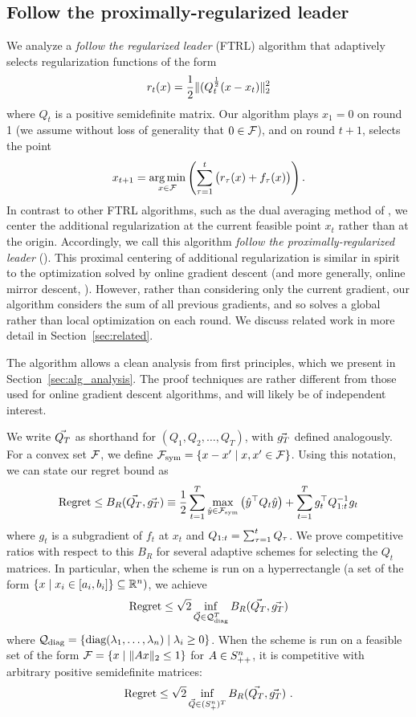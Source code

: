 \subsection{Follow the proximally-regularized leader}
We analyze a \emph {follow the regularized leader}
(FTRL) algorithm
that adaptively selects regularization functions of the
form
\[r_t(x) = \frac 1 2 \|  (Q_t^{\frac 1 2}(x  - x_t) \|^2_2\]
where $Q_t$ is a positive semidefinite matrix.
Our algorithm plays $x_1 = 0$ on round 1 (we assume without loss
of generality that $0 \in \mathcal{F}$), and on round $t+1$, selects the point
\begin{equation}\label{eq:ftrlx}
  x_{t+1} = \mathop{\rm arg\,min}_{x \in \mathcal{F}} \left( 
     \sum_{\tau=1}^t \big(r_\tau(x) + f_\tau(x)\big)  \right).
\end{equation}
In contrast to other FTRL algorithms, such as the dual averaging
method of , we center the additional
regularization at the current feasible point $x_t$ rather than at the
origin.  Accordingly, we call this algorithm \emph{follow the
proximally-regularized leader} (\FTPRL).  This proximal centering of
additional regularization is similar in spirit to the optimization
solved by online gradient descent (and more generally, online mirror
descent, \cite{cesabianchi06plg}).  However, rather than considering
only the current gradient, our algorithm considers the sum of all
previous gradients, and so solves a global rather than local
optimization on each round.  We discuss related work in more detail in
Section~\ref{sec:related}.

The \FTPRL algorithm allows a clean analysis from first principles,
which we present in Section~\ref{sec:alg_analysis}.
The proof
techniques are rather different from those used for online gradient
descent algorithms, and will likely be of independent interest.

We write $\vec{Q_T}$ as shorthand for $(Q_1, Q_2, \dots, Q_T)$, with
$\vec{g_T}$ defined analogously.  For a convex set $\mathcal{F}$, we define
$\mathcal{F}_{\text{sym}} = \left\{ x - x' \mid x, x' \in \mathcal{F}\right\}$. Using this notation, we
can state our regret bound as
\begin{equation}\label{eq:brfunc}
\text{Regret} 
 \leq B_R(\vec{Q_T}, \vec{g_T}) 
 \equiv \frac{1}{2} \sum_{t=1}^T \max_{\hat{y} \in \mathcal{F}_{\text{sym}}} \left( \hat{y}^\top Q_t\hat{y} \right)
          + \sum_{t=1}^T g_t^\top Q_{1:t}^{-1}g_t
\end{equation}
where $g_t$ is a subgradient of $f_t$ at $x_t$ and $Q_{1:t} =
\sum_{\tau=1}^t Q_\tau$.  We prove competitive ratios with respect to
this $B_R$ for several adaptive schemes for selecting the $Q_t$
matrices.  In particular, when the \FTPRLdiag scheme is run on a
hyperrectangle (a set of the form $\left\{x \mid x_i
\in [a_i, b_i]\right\} \subseteq \mathbb{R}^n)$, we achieve
\[ \text{Regret} 
\leq  \sqrt{2} \inf_{\vec{Q} \in \mathcal{Q}_{\text{diag}}^T} B_R(\vec{Q_T}, \vec{g_T})
\]
where $\mathcal{Q}_{\text{diag}} = \left\{ \text{diag}(\lambda_1, \dots, \lambda_n) \mid
\lambda_i \geq 0\right\}$.  When the \FTPRLscale scheme is run on a
feasible set of the form $\mathcal{F} = \left\{x \mid \| Ax \|_2 \leq 1\right\}$ for $A \in S^n_{++}$,
it is competitive with arbitrary positive semidefinite matrices:
\[ \text{Regret} \leq \sqrt{2} 
\inf_{\vec{Q} \in (S^n_{+})^T} B_R(\vec{Q_T}, \vec{g_T})\ .
\] 



